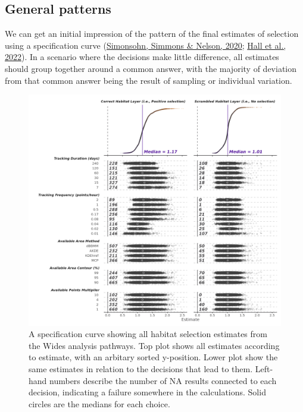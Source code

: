 \documentclass[10pt,a4paper]{article}
\begin{document}
\hypertarget{general-patterns}{%
\subsection{General patterns}\label{general-patterns}}

We can get an initial impression of the pattern of the final estimates of selection using a specification curve (\protect\hyperlink{ref-simonsohn_specification_2020}{Simonsohn, Simmons \& Nelson, 2020}; \protect\hyperlink{ref-hall_survey_2022}{Hall et al., 2022}).
In a scenario where the decisions make little difference, all estimates should group together around a common answer, with the majority of deviation from that common answer being the result of sampling or individual variation.

\begin{figure}
\includegraphics[width=1\linewidth]{../figures/widesSpecCurve} \caption{A specification curve showing all habitat selection estimates from the Wides analysis pathways. Top plot shows all estimates according to estimate, with an arbitary sorted y-position. Lower plot show the same estimates in relation to the decisions that lead to them. Left-hand numbers describe the number of NA results connected to each decision, indicating a failure somewhere in the calculations. Solid circles are the medians for each choice.}\label{fig:specCurveWides}
\end{figure}
\end{document}
